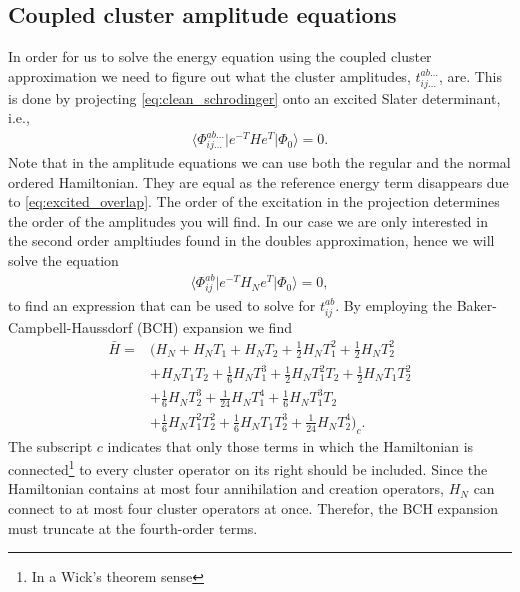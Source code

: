 \documentclass[
    a4paper, aps, twocolumn, floatfix, superscriptaddress,
    nofootinbib]{revtex4-1}
\newcommand{\1}{\mathds{1}}
\newcommand{\bra}[1]{\langle #1\lvert}
\newcommand{\ket}[1]{\rvert #1\rangle}
\newcommand{\kslat}{\ket{\Phi_0}}
\begin{document}
    \subsection{Coupled cluster amplitude equations}
        In order for us to solve the energy equation using the coupled cluster
        approximation we need to figure out what the cluster amplitudes,
        $t_{ij\dots}^{ab\dots}$, are. This is done by projecting
        \autoref{eq:clean_schrodinger} onto an excited Slater determinant, i.e.,
        \begin{align}
            \bra{\Phi_{ij\dots}^{ab\dots}}e^{-T}He^{T}\kslat
            = 0.
        \end{align}
        Note that in the amplitude equations we can use both the regular and the
        normal ordered Hamiltonian. They are equal as the reference energy term
        disappears due to \autoref{eq:excited_overlap}. The order of the
        excitation in the projection determines the order of the amplitudes you
        will find. In our case we are only interested in the second order
        ampltiudes found in the doubles approximation, hence we will solve the
        equation
        \begin{align}
            \bra{\Phi_{ij}^{ab}}e^{-T}H_N e^{T}\kslat = 0,
            \label{eq:doubles_amplitude_1}
        \end{align}
        to find an expression that can be used to solve for $t_{ij}^{ab}$.
        By employing the Baker-Campbell-Haussdorf (BCH) expansion we find
        \begin{equation}
        \begin{aligned}
        		\bar{H} 
        			=& \Big(
        					H_N + H_NT_1 + H_NT_2 + \frac{1}{2}H_NT_1^2 
        					+ \frac{1}{2}H_NT_2^2 \\
        				  &+ H_NT_1T_2 + \frac{1}{6}H_NT_1^3 
        				    + \frac{1}{2}H_NT_1^2T_2 + \frac{1}{2}H_NT_1T_2^2 \\
        				  &+ \frac{1}{6}H_NT_2^3 + \frac{1}{24}H_NT_1^4 
        				    + \frac{1}{6}H_NT_1^3T_2 \\
        				 &+ \frac{1}{6}H_NT_1^2T_2^2 + \frac{1}{6}H_NT_1T_2^3
        				   + \frac{1}{24} H_NT_2^4
        				 \Big)_c.
        \end{aligned}
        \label{eq:normal_order_expansion}
        \end{equation}
		The subscript $c$ indicates that only those terms in which the 
		Hamiltonian is connected\footnote{In a Wick's theorem sense}
		to every cluster operator on its right should be included. Since
		the Hamiltonian contains at most four annihilation and creation 
		operators, $H_N$ can connect to at most four cluster operators
		at once. Therefor, the BCH expansion must truncate at the
		fourth-order terms. 
		
\end{document}
